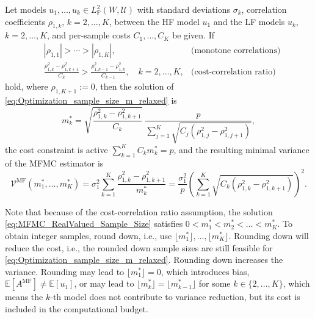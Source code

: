\begin{theorem}   \label{thm:Sample_size_real}
   Let models $u_1, \ldots, u_k \in   L_{\mathbb{P}}^2(W, {\mathcal U})$ with
   standard deviations $\sigma_k$, correlation coefficients $\rho_{1,k}$, $k = 2, \ldots, K$,
   between the HF model $u_1$  and the  LF models $u_k$, $k = 2, \ldots, K$, and 
   per-sample costs $C_1, \ldots, C_K$ be given.
   If 
   \begin{subequations}\label{eq:Sample_size_real_assumptions}
   \begin{align}
       \label{eq:Sample_size_real_assumptions_a}
        & |\rho_{1,1}| > \cdots > |\rho_{1,K}|, & \text{(monotone correlations)} \\
      \label{eq:Sample_size_real_assumptions_b}
        & \frac{ \rho_{1,k}^2 - \rho_{1,k+1}^2 }{C_k} > \frac{ \rho_{1,k-1}^2 - \rho_{1,k}^2 }{C_{k-1}}, \quad k=2,\ldots,K, 
                                                                  & \text{(cost-correlation ratio)}
    \end{align}
    \end{subequations}
    hold, where $\rho_{1,K+1} :=0$, then the solution of \eqref{eq:Optimization_sample_size_m_relaxed} is
    \begin{equation}\label{eq:MFMC_RealValued_Sample_Size}
             m_k^* = \sqrt{\frac{\rho_{1,k}^2 - \rho_{1,k+1}^2}{C_k}} \; 
                          \frac{p}{\sum_{j=1}^K \sqrt{C_j (\rho_{1,j}^2 - \rho_{1,j+1}^2)}},
     \end{equation}
    the cost constraint is active $\sum_{k=1}^K C_km_k^* = p$, 
    and the resulting minimal variance of the MFMC estimator is
     \begin{equation}\label{eq:MFMC_variance_optimal}
           \mathcal{V}^{\text{MF}}(m_1^*, \ldots, m_K^*)
           =   \sigma_1^2  \sum_{k=1}^K \frac{ \rho_{1,k}^2 - \rho_{1,k+1}^2}{m_k^*}
           =  \frac{\sigma_1^2}{p}\!\left(\sum_{k=1}^K \sqrt{C_k (\rho_{1,k}^2 - \rho_{1,k+1}^2) }\right)^{\!2}.
       \end{equation}
\end{theorem}

Note that because of the cost-correlation ratio assumption, the  solution \eqref{eq:MFMC_RealValued_Sample_Size}
satisfies $0  < m_1^* < m_2^* <  \ldots < m_K^*$.
To obtain integer samples,  \cite[p.~A3171]{BPeherstorfer_KWillcox_MDGunzburger_2016a}
round down, i.e., use $\lfloor m_1^* \rfloor, \ldots, \lfloor m_K^* \rfloor$. 
Rounding down will reduce the cost, i.e., the rounded down sample sizes are still feasible for
\eqref{eq:Optimization_sample_size_m_relaxed}. Rounding down increases the variance.
Rounding may lead to $\lfloor m_1^* \rfloor = 0$, which introduces bias,  
$\mathbb{E}[A^{\text{MF}}] \not=  \mathbb{E}[u_1]$,
or may lead to $\lfloor m_k^* \rfloor = \lfloor m_{k-1}^* \rfloor$ for some $k \in \{ 2, \ldots, K\}$, 
which means the $k$-th model does not contribute to variance reduction, but its cost is included in the
computational budget.

